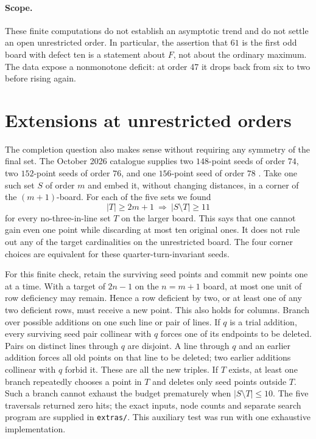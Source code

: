 \documentclass[11pt]{article}
\begin{document}
\paragraph{Scope.} These finite computations do not establish an asymptotic trend and do not settle an open unrestricted order. In particular, the assertion that $61$ is the first odd board with defect ten is a statement about $F$, not about the ordinary maximum. The data expose a nonmonotone deficit: at order 47 it drops back from six to two before rising again.

\appendix
\section{Extensions at unrestricted orders}
The completion question also makes sense without requiring any symmetry of the final set. The October 2026 catalogue supplies two $148$-point seeds of order $74$, two $152$-point seeds of order $76$, and one $156$-point seed of order $78$ \cite{catalogue}. Take one such set $S$ of order $m$ and embed it, without changing distances, in a corner of the $(m+1)$-board. For each of the five sets we found
\[
 |T|\ge 2m+1\ \Longrightarrow\ |S\setminus T|\ge 11
\]
for every no-three-in-line set $T$ on the larger board. This says that one cannot gain even one point while discarding at most ten original ones. It does not rule out any of the target cardinalities on the unrestricted board. The four corner choices are equivalent for these quarter-turn-invariant seeds.

For this finite check, retain the surviving seed points and commit new points one at a time. With a target of $2n-1$ on the $n=m+1$ board, at most one unit of row deficiency may remain. Hence a row deficient by two, or at least one of any two deficient rows, must receive a new point. This also holds for columns. Branch over possible additions on one such line or pair of lines. If $q$ is a trial addition, every surviving seed pair collinear with $q$ forces one of its endpoints to be deleted. Pairs on distinct lines through $q$ are disjoint. A line through $q$ and an earlier addition forces all old points on that line to be deleted; two earlier additions collinear with $q$ forbid it. These are all the new triples. If $T$ exists, at least one branch repeatedly chooses a point in $T$ and deletes only seed points outside $T$. Such a branch cannot exhaust the budget prematurely when $|S\setminus T|\le10$. The five traversals returned zero hits; the exact inputs, node counts and separate search program are supplied in \texttt{extras/}. This auxiliary test was run with one exhaustive implementation.
\end{document}
